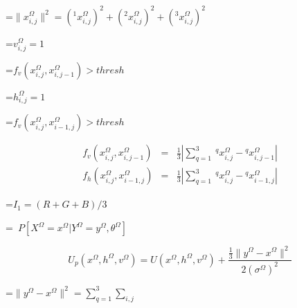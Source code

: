 {\newpage
\clearpage
\samepage \setbox\sizebox=\hbox{$\|x^\Omega_{i,j} \|^2 = (^1x^\Omega_{i,j})^2+(^2x^\Omega_{i,j})^2+(^3x^\Omega_{i,j})^2$}\box\sizebox
}

{\newpage
\clearpage
\samepage \setbox\sizebox=\hbox{$v^\Omega_{i,j}=1$}\box\sizebox
}

{\newpage
\clearpage
\samepage \setbox\sizebox=\hbox{$f_v(x_{i,j}^\Omega, x_{i,j-1}^\Omega) > thresh $}\box\sizebox
}

{\newpage
\clearpage
\samepage \setbox\sizebox=\hbox{$h^\Omega_{i,j}=1$}\box\sizebox
}

{\newpage
\clearpage
\samepage \setbox\sizebox=\hbox{$f_v(x_{i,j}^\Omega, x_{i-1,j}^\Omega) > thresh $}\box\sizebox
}

{\newpage
\clearpage
\samepage \begin{eqnarray}f_v(x_{i,j}^\Omega, x_{i,j-1}^\Omega)&=&\frac{1}{3} \left | \sum_{q=1}^{3}\ ^qx_{i,j}^\Omega - {^qx_{i,j-1}^\Omega}\right | \nonumber
  \\ 
f_h(x_{i,j}^\Omega, x_{i-1,j}^\Omega)&=&\frac{1}{3} \left | \sum_{q=1}^{3}\ ^qx_{i,j}^\Omega - {^qx_{i-1,j}^\Omega} \right |  \label{eq:line}
\end{eqnarray}
}

{\newpage
\clearpage
\samepage \setbox\sizebox=\hbox{$I_1 = (R +G +B)/3$}\box\sizebox
}

{\newpage
\clearpage
\samepage \setbox\sizebox=\hbox{%
$P[X^\Omega=x^\Omega | Y^\Omega=y^\Omega, \theta^\Omega]$}\box\sizebox
}

{\newpage
\clearpage
\samepage \begin{equation}U_{p}(x^\Omega,h^\Omega,v^\Omega) = U(x^\Omega,h^\Omega,v^\Omega) + \frac{ \frac{1}{3} \|y^\Omega-x^\Omega\|^2}{2 (\sigma^\Omega)^2}
\label{energy}
\end{equation}
}

{\newpage
\clearpage
\samepage \setbox\sizebox=\hbox{$\| y^\Omega-x^\Omega \|^2 =  \sum_{q=1}^3
\sum_{i,j}$}\box\sizebox
}

